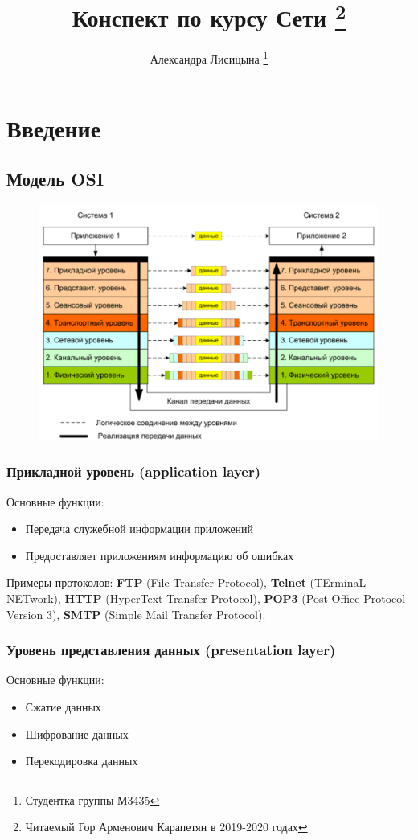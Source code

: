 \documentclass[10pt,a4paper,oneside,titlepage]{report}
\title{Конспект по курсу Сети \thanks{Читаемый Гор Арменович Карапетян в 2019-2020 годах}}
\author{Александра Лисицына \thanks{Студентка группы М3435}}
\theoremstyle{defenition}
\begin{document}
	
\maketitle

\tableofcontents

\clearpage	

\chapter{Введение}

\section{Модель OSI}

\begin{figure}[h!]
	\centering
	\includegraphics[width=0.4\linewidth]{pictures/ModelOSI}
	\caption[Модель OSI]{}
	\label{fig:modelosi}
\end{figure}

\subsection{Прикладной уровень (application layer)}

Основные функции:
\begin{itemize}
	\item Передача служебной информации приложений
	\item Предоставляет приложениям информацию об ошибках
\end{itemize}

Примеры протоколов: {\bfseries FTP} (File Transfer Protocol), {\bfseries Telnet} (TErminaL NETwork), {\bfseries HTTP} (HyperText Transfer Protocol), {\bfseries POP3} (Post Office Protocol Version 3), {\bfseries SMTP} (Simple Mail Transfer Protocol).

\subsection{Уровень представления данных (presentation layer)}

Основные функции:
\begin{itemize}
	\item Сжатие данных
	\item Шифрование данных
	\item Перекодировка данных
\end{itemize}
\end{document}
